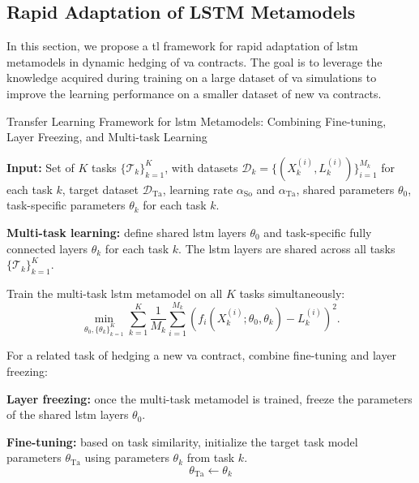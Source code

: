 \subsection{Rapid Adaptation of LSTM Metamodels} \label{sec3:transfer_learning}

In this section, we propose a \gls{tl} framework for rapid adaptation of \gls{lstm} metamodels in dynamic hedging of \gls{va} contracts.
The goal is to leverage the knowledge acquired during training on a large dataset of \gls{va} simulations to improve the learning performance on a smaller dataset of new \gls{va} contracts.


\begin{algorithm}
    \caption{Transfer Learning Framework for \gls{lstm} Metamodels: Combining Fine-tuning, Layer Freezing, and Multi-task Learning}
    \begin{algorithmic}[1] \label{alg3:combined}
        \STATE \textbf{Input:} Set of $K$ tasks $\{\mathcal{T}_k\}_{k=1}^K$, with datasets $\mathcal{D}_k = \{(X_k^{(i)}, L_k^{(i)})\}_{i=1}^{M_k}$ for each task $k$, target dataset $\mathcal{D}_{\text{Ta}}$, learning rate $\alpha_{\text{So}}$ and $\alpha_{\text{Ta}}$, shared parameters $\theta_0$, task-specific parameters $\theta_k$ for each task $k$.
        
        \STATE \textbf{Multi-task learning:} define shared \gls{lstm} layers $\theta_0$ and task-specific fully connected layers $\theta_k$ for each task $k$. The \gls{lstm} layers are shared across all tasks $\{\mathcal{T}_k\}_{k=1}^K$.
        
        \STATE Train the multi-task \gls{lstm} metamodel on all $K$ tasks simultaneously:
        \begin{equation}
            \min_{\theta_0, \{\theta_k\}_{k=1}^K} \sum_{k=1}^K \frac{1}{M_k} \sum_{i=1}^{M_k} \left( f_i(X_k^{(i)}; \theta_0, \theta_k) - L_k^{(i)} \right)^2.
        \end{equation}
        
        \STATE For a related task of hedging a new \gls{va} contract, combine fine-tuning and layer freezing:

        \STATE \textbf{Layer freezing:} once the multi-task metamodel is trained, freeze the parameters of the shared \gls{lstm} layers $\theta_0$.
        
        \STATE \textbf{Fine-tuning:}  based on task similarity, initialize the target task model parameters $\theta_{\text{Ta}}$ using parameters $\theta_k$ from task $k$.
        \[
        \theta_{\text{Ta}} \gets \theta_k 
        \]
        

\end{algorithmic}
\end{algorithm}
